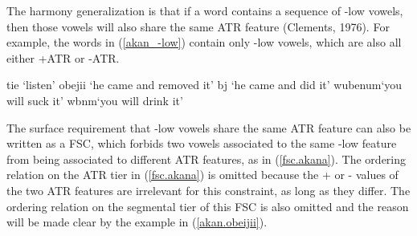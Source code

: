\documentclass[,doc,floatsintext]{apa6}
\theoremstyle{definition}
\theoremstyle{definition}
\theoremstyle{definition}
\theoremstyle{remark}
\begin{document}
The harmony generalization is that if a word contains a sequence of -low
vowels, then those vowels will also share the same ATR feature
(Clements, 1976). For example, the words in (\ref{akan_-low}) contain
only -low vowels, which are also all either +ATR or -ATR.

\begin{exe}
\label{akan_-low}
\begin{xlist}
  \ex tie `listen'
  \ex obejii `he came and removed it'
  \ex {}bj  `he came and did it'
  \ex wubenum\textraiseglotstop `you will suck it'
  \ex wbnm\textraiseglotstop `you will drink it'
  \end{xlist}
\end{exe}

The surface requirement that -low vowels share the same ATR feature can
also be written as a FSC, which forbids two vowels associated to the
same -low feature from being associated to different ATR features, as in
(\ref{fsc.akana}). The ordering relation on the ATR tier in
(\ref{fsc.akana}) is omitted because the + or - values of the two ATR
features are irrelevant for this constraint, as long as they differ. The
ordering relation on the segmental tier of this FSC is also omitted and
the reason will be made clear by the example in (\ref{akan.obeijii}).

\begin{exe}
\ex \label{fsc.akana}
\end{exe}
\end{document}
